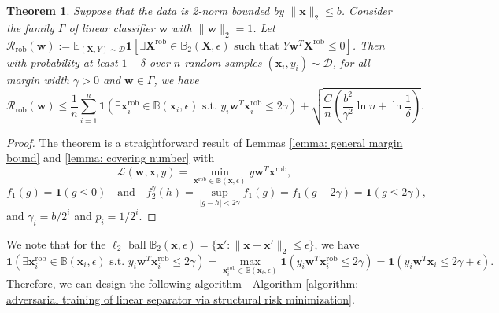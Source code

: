 \documentclass[11pt]{article}
\newcommand{\adv}{\mathrm{rob}}
\newtheorem{theorem}{Theorem}[section]
\newcommand{\w}{\bm{w}}
\newcommand{\x}{\bm{x}}
\newcommand{\X}{\bm{X}}
\newcommand{\0}{\mathbf{0}}
\newcommand{\1}{\mathbf{1}}
\newcommand{\cD}{\mathcal{D}}
\newcommand{\cL}{\mathcal{L}}
\newcommand{\cR}{\mathcal{R}}
\newcommand{\bbB}{\mathbb{B}}
\newcommand{\bbE}{\mathbb{E}}
\begin{document}
\begin{theorem}
Suppose that the data is 2-norm bounded by $\|\x\|_2\le b$. Consider the family $\Gamma$ of linear classifier $\w$ with $\|\w\|_2=1$. Let $\cR_\adv(\w):=\bbE_{(\X,Y)\sim\cD}\1[\exists \X^\adv\in\bbB_2(\X,\epsilon) \text{ such that } Y\w^T\X^\adv\le 0]$. Then with probability at least $1-\delta$ over $n$ random samples $(\x_i,y_i)\sim\cD$, for all margin width $\gamma>0$ and $\w\in\Gamma$, we have
\begin{equation*}
\cR_\adv(\w)\le \frac{1}{n}\sum_{i=1}^n\1(\exists\x_i^\adv\in\bbB(\x_i,\epsilon)\text{ s.t. }y_i\w^T\x_i^\adv\le2\gamma)+\sqrt{\frac{C}{n}\left(\frac{b^2}{\gamma^2}\ln n+\ln\frac{1}{\delta}\right)}.
\end{equation*}
\end{theorem}

\begin{proof}
The theorem is a straightforward result of Lemmas \ref{lemma: general margin bound} and \ref{lemma: covering number} with
$$\cL(\w,\x,y)=\min_{\x^\adv\in\bbB(\x,\epsilon)}y\w^T\x^\adv,$$
$$f_1(g)=\1(g\le 0)\quad\mbox{and}\quad f_2^\gamma(h)=\sup_{|g-h|<2\gamma} f_1(g)=f_1(g-2\gamma)=\1(g\le 2\gamma),$$
and $\gamma_i=b/2^i$ and $p_i=1/2^i$.
\end{proof}

We note that for the $\ell_2$ ball $\bbB_2(\x,\epsilon)=\{\x':\|\x-\x'\|_2\le\epsilon\}$, we have
\begin{equation*}
\1(\exists\x_i^\adv\in\bbB(\x_i,\epsilon)\text{ s.t. }y_i\w^T\x_i^\adv\le2\gamma)=\max_{\x_i^\adv\in\bbB(\x_i,\epsilon)}\1(y_i\w^T\x_i^\adv\le2\gamma)=\1(y_i\w^T\x_i\le2\gamma+\epsilon).
\end{equation*}
Therefore, we can design the following algorithm---Algorithm \ref{algorithm: adversarial training of linear separator via structural risk minimization}.
\end{document}
